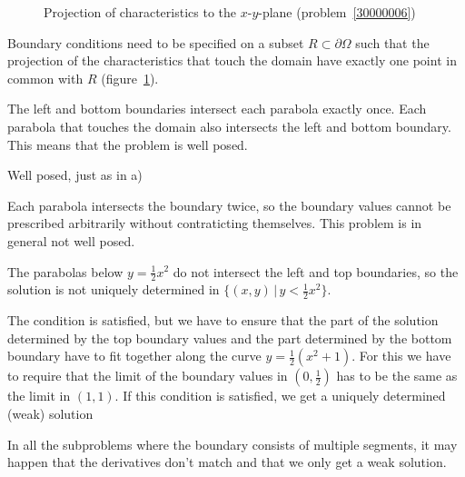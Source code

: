 \begin{loesung}
\begin{figure}
\begin{center}
\end{center}
\caption{Projection of characteristics to the $x$-$y$-plane
(problem~\ref{30000006})
\label{30000006:char}}
\end{figure}
Boundary conditions need to be specified on a subset
$R\subset \partial\Omega$ such that the projection of the
characteristics that touch the domain have exactly one
point in common with $R$
(figure~\ref{30000006:char}). 
\begin{teilaufgaben}
\item
The left and bottom boundaries intersect each parabola exactly once.
Each parabola that touches the domain also intersects the left and bottom
boundary.
This means that the problem is well posed.
\item
Well posed, just as in a)
\item
Each parabola intersects the boundary twice, so the boundary values
cannot be prescribed arbitrarily without contraticting themselves.
This problem is in general not well posed.
\item
The parabolas below $y=\frac12x^2$ do not intersect the left and top
boundaries, so the solution is not uniquely determined in
$\{(x,y)\,|\, y<\frac12x^2\}$.
\item 
The condition is satisfied, but we have to ensure that the part of
the solution determined by the top boundary values and the
part determined by the bottom boundary have to fit together along
the curve $y=\frac12(x^2+1)$.
For this we have to require that the limit of the boundary values
in $(0,\frac12)$ has to be the same as the limit in $(1,1)$.
If this condition is satisfied, we get a uniquely determined 
(weak) solution
\end{teilaufgaben}
In all the subproblems where the boundary consists of multiple segments,
it may happen that the derivatives don't match and that we only get
a weak solution.
\end{loesung}
